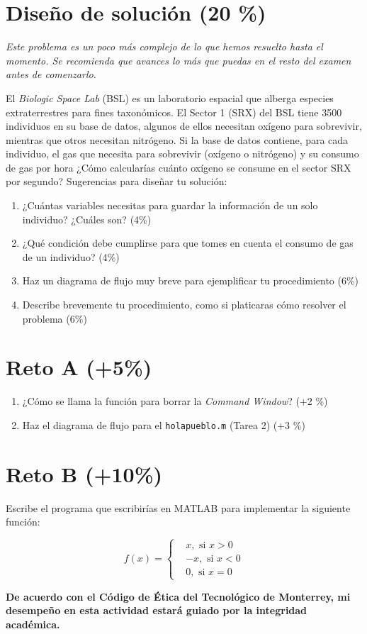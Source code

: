 \documentclass[11pt, onside]{article}
\begin{document}
\section{Diseño de solución (20 \%)}

{\small \it
Este problema es un poco más complejo de lo que hemos resuelto hasta el momento.
Se recomienda que avances lo más que puedas en el resto del examen antes de comenzarlo.
}

\bigskip

El \textit{Biologic Space Lab} (BSL) es un laboratorio espacial que alberga especies extraterrestres para fines taxonómicos.
El Sector 1 (SRX) del BSL tiene 3500 individuos en su base de datos, algunos de ellos necesitan oxígeno para sobrevivir, mientras que otros necesitan nitrógeno.
Si la base de datos contiene, para cada individuo, el gas que necesita para sobrevivir (oxígeno o nitrógeno) y su consumo de gas por hora ¿Cómo calcularías cuánto oxígeno se consume en el sector SRX por segundo?
Sugerencias para diseñar tu solución:
\begin{enumerate}[label=\alph*)]
    \item ¿Cuántas variables necesitas para guardar la información de un solo individuo? ¿Cuáles son? (4\%)
    \item ¿Qué condición debe cumplirse para que tomes en cuenta el consumo de gas de un individuo? (4\%)
    \item Haz un diagrama de flujo muy breve para ejemplificar tu procedimiento  (6\%)
    \item Describe brevemente tu procedimiento, como si platicaras cómo resolver el problema (6\%)
\end{enumerate}

\section{Reto A (+5\%)}

\begin{enumerate}[label=\alph*)]
    \item ¿Cómo se llama la función para borrar la \textit{Command Window}? (+2 \%)
    \item Haz el diagrama de flujo para el \texttt{holapueblo.m} (Tarea 2) (+3 \%)
\end{enumerate}

\section{Reto B (+10\%)}

Escribe el programa que escribirías en MATLAB para implementar la siguiente función:

$$f(x) = %
\begin{cases}
    &x, \text{ si } x > 0 \\
    & -x, \text{ si } x < 0 \\
    &0, \text{ si } x = 0
\end{cases}
$$

\vfill

\textbf{De acuerdo con el Código de Ética del Tecnológico de Monterrey, mi desempeño en esta actividad estará guiado por la integridad académica.}
\end{document}
